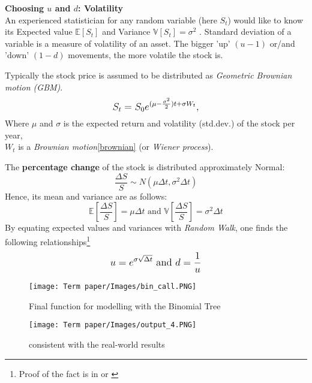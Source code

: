 \documentclass[11pt]{article}
\begin{document}
\textbf{Choosing $u$ and $d$: Volatility}\\
\label{u}
An experienced statistician for any random variable (here $S_t$) would like to know its Expected value $\mathbb{E}{[S_t]}$ and Variance $\mathbb{V}{[S_t]} = \sigma^2$ . Standard deviation of a variable is a measure of volatility of an asset. The bigger 'up' $(u-1)$ or/and 'down' $(1-d)$ movements, the more volatile the stock is.
\par Typically the stock price is assumed to be distributed as \textit{Geometric Brownian motion (GBM)}.\cite{S_73}
\begin{equation}
\label{eqn:gbm}
\mathlarger{S_t = S_0e^{(\mu-\frac{\sigma^2}{2})t+\sigma{W_t}},}
\end{equation}
Where $\mu$ and $\sigma$ is the expected return and volatility (std.dev.) of the stock per year,\\ 
$W_t$ is a \textit{Brownian motion}\ref{brownian} (or \textit{Wiener process}).

\noindent The \textbf{percentage change} of the stock is distributed approximately Normal:
\begin{equation}
\label{eqn:dsdist}
\frac{\Delta{S}}{S} \sim N(\mu\Delta{t}, \sigma^2\Delta{t})
\end{equation}
Hence, its mean and variance are as follows:
\begin{equation}
\label{eqn:mv}
\mathbb{E}{[\frac{\Delta{S}}{S}]} = \mu\Delta{t} \text{ and } \mathbb{V}{[\frac{\Delta{S}}{S}]}= \sigma^2\Delta{t}
\end{equation}
By equating expected values and variances with \textit{Random Walk}, one finds the following relationships\footnote{Proof of the fact is in \cite{Hull_9} or \cite{FCS}}
\begin{equation}
\label{eqn:ud}
\mathlarger{u = e^{\sigma\sqrt{\Delta{t}}} \text{ and } d = \frac{1}{u}}
\end{equation}

\begin{figure}[H]
  \centering
  \texttt{[image: Term paper/Images/bin\_call.PNG]}
  \caption{Final function for modelling with the Binomial Tree}
  \label{fig:bincall}
\end{figure}

\begin{figure}[H]
  \centering
  \texttt{[image: Term paper/Images/output\_4.PNG]}
  \caption{consistent with the real-world results}
  \label{fig:out4}
\end{figure}
\end{document}
